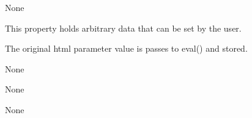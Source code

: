 \documentclass[letterpaper,10pt,english]{sphinxmanual}
\begin{document}
\begin{fulllineitems}
\begin{fulllineitems}
\end{fulllineitems}


\begin{fulllineitems}
\label{api:controls.TextIOBox.truncate}
None

\end{fulllineitems}


\begin{fulllineitems}
\label{api:controls.TextIOBox.user}
This property holds arbitrary data that can be set by the user.

The original html parameter value is passes to eval() and stored.

\end{fulllineitems}


\begin{fulllineitems}
\label{api:controls.TextIOBox.value}
None

\end{fulllineitems}


\begin{fulllineitems}
\label{api:controls.TextIOBox.write}
None

\end{fulllineitems}


\begin{fulllineitems}
\label{api:controls.TextIOBox.writelines}
None

\end{fulllineitems}


\end{fulllineitems}

\end{document}
